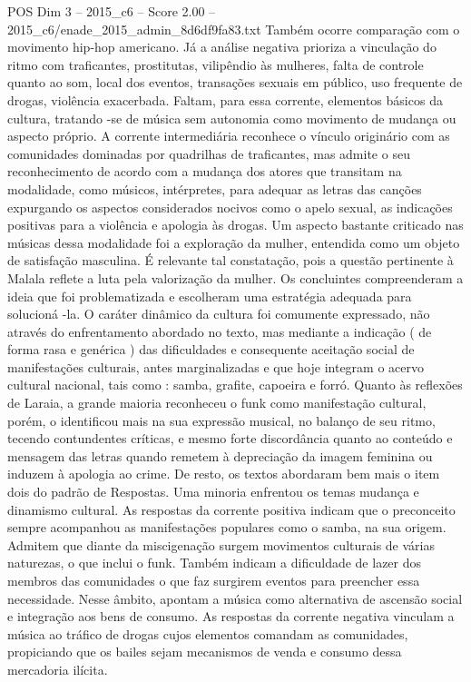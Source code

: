 \begin{textsample}{POS Dim 3 – 2015\_c6 – Score 2.00 – 2015\_c6/enade\_2015\_admin\_8d6df9fa83.txt}
Também ocorre comparação com o movimento hip-hop americano.
Já a análise negativa prioriza a vinculação do ritmo com traficantes, prostitutas, vilipêndio às mulheres, falta de controle quanto ao som, local dos eventos, transações sexuais em público, uso frequente de drogas, violência exacerbada.
Faltam, para essa corrente, elementos básicos da cultura, tratando -se de música sem autonomia como movimento de mudança ou aspecto próprio.
A corrente intermediária reconhece o vínculo originário com as comunidades dominadas por quadrilhas de traficantes, mas admite o seu reconhecimento de acordo com a mudança dos atores que transitam na modalidade, como músicos, intérpretes, para adequar as letras das canções expurgando os aspectos considerados nocivos como o apelo sexual, as indicações positivas para a violência e apologia às drogas.
Um aspecto bastante criticado nas músicas dessa modalidade foi a exploração da mulher, entendida como um objeto de satisfação masculina.
É relevante tal constatação, pois a questão pertinente à Malala reflete a luta pela valorização da mulher.
Os concluintes compreenderam a ideia que foi problematizada e escolheram uma estratégia adequada para solucioná -la.
O caráter dinâmico da cultura foi comumente expressado, não através do enfrentamento abordado no texto, mas mediante a indicação ( de forma rasa e genérica ) das dificuldades e consequente aceitação social de manifestações culturais, antes marginalizadas e que hoje integram o acervo cultural nacional, tais como : samba, grafite, capoeira e forró.
Quanto às reflexões de Laraia, a grande maioria reconheceu o funk como manifestação cultural, porém, o identificou mais na sua expressão musical, no balanço de seu ritmo, tecendo contundentes críticas, e mesmo forte discordância quanto ao conteúdo e mensagem das letras quando remetem à depreciação da imagem feminina ou induzem à apologia ao crime.
De resto, os textos abordaram bem mais o item dois do padrão de Respostas.
Uma minoria enfrentou os temas mudança e dinamismo cultural.
As respostas da corrente positiva indicam que o preconceito sempre acompanhou as manifestações populares como o samba, na sua origem.
Admitem que diante da miscigenação surgem movimentos culturais de várias naturezas, o que inclui o funk.
Também indicam a dificuldade de lazer dos membros das comunidades o que faz surgirem eventos para preencher essa necessidade.
Nesse âmbito, apontam a música como alternativa de ascensão social e integração aos bens de consumo.
As respostas da corrente negativa vinculam a música ao tráfico de drogas cujos elementos comandam as comunidades, propiciando que os bailes sejam mecanismos de venda e consumo dessa mercadoria ilícita.

\end{textsample}
